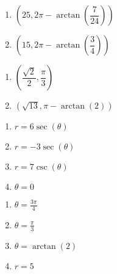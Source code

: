 \begin{multicols}{2}

\begin{enumerate}

\setcounter{enumi}{\value{HW}}

\item  $\left(25, 2\pi - \arctan\left(\dfrac{7}{24}\right) \right)$
\item  $\left( 15, 2\pi - \arctan\left(\dfrac{3}{4} \right) \right)$

\setcounter{HW}{\value{enumi}}

\end{enumerate}

\end{multicols}

\begin{multicols}{2}

\begin{enumerate}

\setcounter{enumi}{\value{HW}}

\item  $\left(\dfrac{\sqrt{2}}{2}, \dfrac{\pi}{3}\right)$
\item  $\left(\sqrt{13}, \pi - \arctan(2) \right)$ 

\setcounter{HW}{\value{enumi}}

\end{enumerate}

\end{multicols}

\begin{multicols}{4}

\begin{enumerate}

\setcounter{enumi}{\value{HW}}

\item $r = 6\sec(\theta)$
\item $r = -3\sec(\theta)$
\item $r = 7\csc(\theta)$
\item $\theta = 0$ 

\setcounter{HW}{\value{enumi}}

\end{enumerate}

\end{multicols}

\begin{multicols}{4}

\begin{enumerate}

\setcounter{enumi}{\value{HW}}

\item $\theta = \frac{3\pi}{4}$  
\item $\theta = \frac{\pi}{3}$  
\item $\theta = \arctan(2)$
\item $r = 5$

\setcounter{HW}{\value{enumi}}

\end{enumerate}

\end{multicols}

